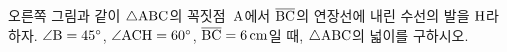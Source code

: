 \noindent\begin{minipage}[t]{0.58\linewidth}\vspace{0pt}\raggedright 오른쪽 그림과 같이 $\triangle\mathrm{ABC}$의 꼭짓점~$\mathrm{A}$에서 $\overline{\mathrm{BC}}$의 연장선에 내린 수선의 발을 $\mathrm{H}$라 하자. $\angle\mathrm{B}=45^\circ$, $\angle\mathrm{ACH}=60^\circ$, $\overline{\mathrm{BC}}=6\,\mathrm{cm}$일 때, $\triangle\mathrm{ABC}$의 넓이를 구하시오.\end{minipage}\hfill\begin{minipage}[t]{0.4\linewidth}\vspace{0pt}\centering \resizebox{\ifdim\width>\linewidth\linewidth\else\width\fi}{!}{}\end{minipage}\par
